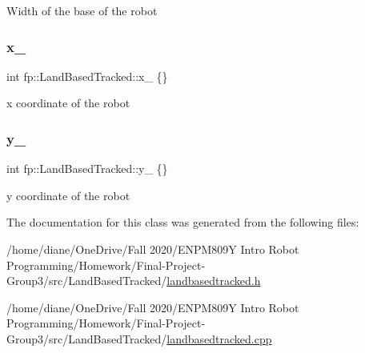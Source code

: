 Width of the base of the robot \mbox{\label{classfp_1_1_land_based_tracked_a8001133ebf0739a851c283248b7bf3f3}} 
\subsubsection{\texorpdfstring{x\+\_\+}{x\_}}
{\footnotesize\ttfamily int fp\+::\+Land\+Based\+Tracked\+::x\+\_\+ \{\}\hspace{0.3cm}{\ttfamily [protected]}}

x coordinate of the robot \mbox{\label{classfp_1_1_land_based_tracked_ae8f41c1bd340a84c7704b3bd7281ae79}} 
\subsubsection{\texorpdfstring{y\+\_\+}{y\_}}
{\footnotesize\ttfamily int fp\+::\+Land\+Based\+Tracked\+::y\+\_\+ \{\}\hspace{0.3cm}{\ttfamily [protected]}}

y coordinate of the robot 

The documentation for this class was generated from the following files\+:\begin{DoxyCompactItemize}
\item 
/home/diane/\+One\+Drive/\+Fall 2020/\+E\+N\+P\+M809\+Y Intro Robot Programming/\+Homework/\+Final-\/\+Project-\/\+Group3/src/\+Land\+Based\+Tracked/\hyperlink{landbasedtracked_8h}{landbasedtracked.\+h}\item 
/home/diane/\+One\+Drive/\+Fall 2020/\+E\+N\+P\+M809\+Y Intro Robot Programming/\+Homework/\+Final-\/\+Project-\/\+Group3/src/\+Land\+Based\+Tracked/\hyperlink{landbasedtracked_8cpp}{landbasedtracked.\+cpp}\end{DoxyCompactItemize}

